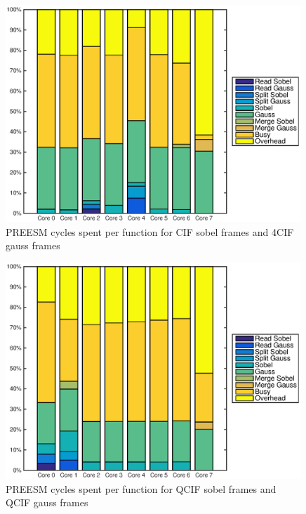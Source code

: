 \begin{figure}[h!]
    \begin{center}
        \includegraphics[width=0.99\textwidth]{images/preesm_sobelcif_gauss4cif.eps}
        \caption{PREESM cycles spent per function for CIF sobel frames and 4CIF gauss frames}
        \label{fig:preesmgauss4cif}
    \end{center}
\end{figure}

\begin{figure}[h!]
    \begin{center}
        \includegraphics[width=0.99\textwidth]{images/preesm_sobelqcif_gaussqcif.eps}
        \caption{PREESM cycles spent per function for QCIF sobel frames and QCIF gauss frames}
        \label{fig:preesmgauss4cif}
    \end{center}
\end{figure}


